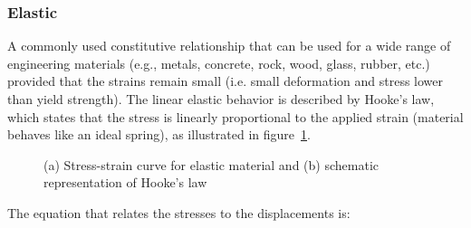 \documentclass[a4paper,11pt]{book}
\begin{document}
\subsubsection{Elastic}
A commonly used constitutive relationship that can be used for a wide range of engineering materials (e.g., metals, concrete, rock, wood, glass, rubber, etc.) provided that the strains remain small (i.e. small deformation and stress lower than yield strength). The linear elastic behavior is described by Hooke's law, which states that the stress is linearly proportional to the applied strain (material behaves like an ideal spring), as illustrated in figure~\ref{fig:smm:cl:elastic}.
\begin{figure}[!htb]
  \begin{center}

    \hspace{0.05\textwidth}
    \caption{(a) Stress-strain curve for elastic material and (b) schematic representation of Hooke's law}
    \label{fig:smm:cl:elastic}
  \end{center}
\end{figure}
The equation that relates the stresses to the displacements is:
\end{document}

